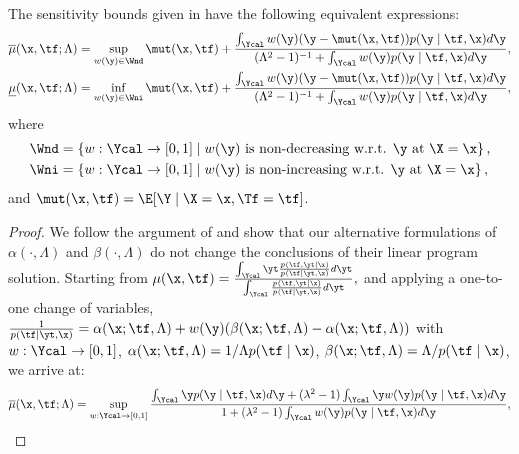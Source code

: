 \begin{lemma}
    \label{lem:monotonic}
    The sensitivity bounds given in  have the following equivalent expressions:
    \begin{equation*}
        \begin{split}
            \overline{\mu}(\x, \tf; \Lambda) &= \sup_{w(\y) \in \Wnd} \mut(\x, \tf) + \frac{\int_\Ycal w(\y) (\y - \mut(\x, \tf)) p(\y \mid \tf, \x)d\y}{(\Lambda^2 - 1)^{-1} + \int_\Ycal w(\y)p(\y \mid \tf, \x)d\y}, \\
            \underline{\mu}(\x, \tf; \Lambda) &= \inf_{w(\y) \in \Wni} \mut(\x, \tf) + \frac{\int_\Ycal w(\y) (\y - \mut(\x, \tf)) p(\y \mid \tf, \x)d\y}{(\Lambda^2 - 1)^{-1} + \int_\Ycal w(\y)p(\y \mid \tf, \x)d\y},
        \end{split}
    \end{equation*}
    where 
    \begin{equation*}
        \begin{split}
            \Wnd &= \left\{ w:\Ycal \to [0, 1] \mid w(\y) \text{ is non-decreasing w.r.t. } \y \text{ at } \X=\x \right\}, \\
            \Wni &= \left\{ w:\Ycal \to [0, 1] \mid w(\y) \text{ is non-increasing w.r.t. } \y \text{ at } \X=\x \right\},
        \end{split}
    \end{equation*}
    and $\mut(\x, \tf) = \E[\Y \mid \X=\x, \Tf=\tf]$.
    \begin{proof}
        We follow the argument of \cite{kallus2019interval} and show that our alternative formulations of $\alpha(\cdot, \Lambda)$ and $\beta(\cdot, \Lambda)$ do not change the conclusions of their linear program solution. 
        Starting from $\mu(\x, \tf) = \frac{\int_{\Ycal} \yt \frac{p(\tf, \yt \mid \x)}{p(\tf \mid \yt, \x)}d\yt}{\int_{\Ycal} \frac{p(\tf, \yt \mid \x)}{p(\tf \mid \yt, \x)}d\yt},$ and applying a one-to-one change of variables, $\frac{1}{p(\tf \mid \yt, \x)} = \alpha(\x; \tf, \Lambda) + w(\y) (\beta(\x; \tf, \Lambda) - \alpha(\x; \tf, \Lambda))$ with $w:\Ycal \to [0, 1]$, $\alpha(\x; \tf, \Lambda) = 1 / \Lambda p(\tf \mid \x)$, $\beta(\x; \tf, \Lambda) = \Lambda / p(\tf \mid \x)$, we arrive at:
        \begin{equation}
            \label{eq:upper_capo_app}
            \overline{\mu}(\x, \tf; \Lambda) 
            = \sup_{w: \Ycal \to [0, 1]} \frac{\int_{\Ycal} \y p(\y \mid \tf, \x)d\y + (\lambda^2 - 1)\int_{\Ycal} \y w(\y)p(\y \mid \tf, \x)d\y}{1 + (\lambda^2 - 1)\int_{\Ycal} w(\y)p(\y \mid \tf, \x)d\y},

\end{equation}
\end{proof}
\end{lemma}
